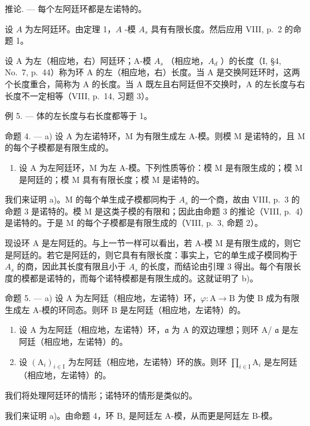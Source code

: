 推论. --- 每个左阿廷环都是左诺特的。

设 \(A\) 为左阿廷环。由定理 1，\(A\) -模 \(A_s\) 具有有限长度。然后应用 VIII, p.~2 的命题 1。

设 A 为左（相应地，右）阿廷环；A-模 \(A_{s}\) （相应地，\(A_{d}\) ）的长度（I, §4, No.~7, p.~44）称为环 A 的左（相应地，右）长度。当 A 是交换阿廷环时，这两个长度重合，简称为 A 的长度。当 A 既左且右阿廷但不交换时，A 的左长度与右长度不一定相等（VIII, p.~14, 习题 3）。

例 5. --- 体的左长度与右长度都等于 1。

命题 4. --- a) 设 A 为左诺特环，M 为有限生成左 A-模。则模 M 是诺特的，且 M 的每个子模都是有限生成的。

\begin{enumerate}
\def\labelenumi{\alph{enumi})}
\setcounter{enumi}{1}
\tightlist
\item
  设 A 为左阿廷环，M 为左 A-模。下列性质等价：模 M 是有限生成的；模 M 是阿廷的；模 M 具有有限长度；模 M 是诺特的。
\end{enumerate}

我们来证明 a)。M 的每个单生成子模都同构于 \(A_{s}\) 的一个商，故由 VIII, p.~3 的命题 3 是诺特的。模 M 是这类子模的有限和；因此由命题 3 的推论（VIII, p.~4）是诺特的。于是 M 的每个子模都是有限生成的（VIII, p.~3, 命题 2）。

现设环 A 是左阿廷的。与上一节一样可以看出，若 A-模 M 是有限生成的，则它是阿廷的。若它是阿廷的，则它具有有限长度：事实上，它的单生成子模同构于 \(A_{s}\) 的商，因此其长度有限且小于 \(A_{s}\) 的长度，而结论由引理 3 得出。每个有限长度的模都是诺特的，而每个诺特模都是有限生成的。这就证明了 b)。

命题 5. --- a) 设 A 为左阿廷（相应地，左诺特）环，\(\varphi : \mathrm{A} \to \mathrm{B}\) 为使 B 成为有限生成左 A-模的环同态。则环 B 是左阿廷（相应地，左诺特）的。

\begin{enumerate}
\def\labelenumi{\alph{enumi})}
\setcounter{enumi}{1}
\item
  设 A 为左阿廷（相应地，左诺特）环，\(\mathfrak{a}\) 为 A 的双边理想；则环 A/ \(\mathfrak{a}\) 是左阿廷（相应地，左诺特）的。
\item
  设 \((\mathrm{A}_i)_{i\in \mathrm{I}}\) 为左阿廷（相应地，左诺特）环的族。则环 \(\prod_{i\in \mathrm{I}}\mathrm{A}_i\) 是左阿廷（相应地，左诺特）的。
\end{enumerate}

我们将处理阿廷环的情形；诺特环的情形是类似的。

我们来证明 a)。由命题 4，环 \(\mathrm{B}_s\) 是阿廷左 A-模，从而更是阿廷左 B-模。

